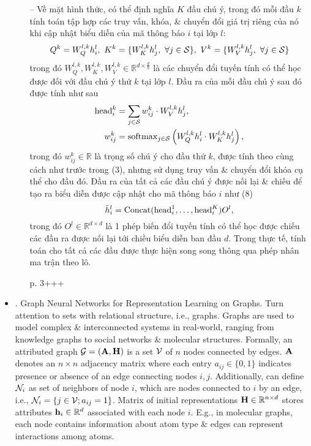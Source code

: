 \documentclass{article}
\begin{document}
\begin{itemize}
\begin{itemize}
        -- Về mặt hình thức, có thể định nghĩa $K$ đầu chú ý, trong đó mỗi đầu $k$ tính toán tập hợp các truy vấn, khóa, \& chuyển đổi giá trị riêng của nó khi cập nhật biểu diễn của mã thông báo $i$ tại lớp $l$:
        \begin{equation*}
            Q^k = W_Q^{l,k}h_i^l,\ K^k = \{W_K^{l,k}h_j^l,\ \forall j\in{\cal S}\},\ V^k = \{W_V^{l,k}h_j^l,\ \forall j\in{\cal S}\}
        \end{equation*}
        trong đó $W_Q^{l,k},W_K^{l,k},W_V^{l,k}\in\mathbb{R}^{d\times\frac{d}{k}}$ là các chuyển đổi tuyến tính có thể học được đối với đầu chú ý thứ $k$ tại lớp $l$. Đầu ra của mỗi đầu chú ý sau đó được tính như sau
        \begin{align*}
            {\rm head}_i^k &= \sum_{j\in{\cal S}} w_{ij}^k\cdot W_V^{l,k}h_j^l,\\
            w_{ij}^k &= {\rm softmax}_{j\in{\cal S}}\left(W_Q^{l,k}h_i^l\cdot W_K^{l,k}h_j^l\right),
        \end{align*}
        trong đó $w_{ij}^k\in\mathbb{R}$ là trọng số chú ý cho đầu thứ $k$, được tính theo cùng cách như trước trong (3), nhưng sử dụng truy vấn \& chuyển đổi khóa cụ thể cho đầu đó. Đầu ra của tất cả các đầu chú ý được nối lại \& chiếu để tạo ra biểu diễn được cập nhật cho mã thông báo $i$ như (8)
        \begin{equation*}
            \tilde{h}_i^l = {\rm Concat}({\rm head}_i^1,\ldots,{\rm head}_i^K)O^l,
        \end{equation*}
        trong đó $O^l\in\mathbb{R}^{d\times d}$ là 1 phép biến đổi tuyến tính có thể học được chiếu các đầu ra được nối lại tới chiều biểu diễn ban đầu $d$. Trong thực tế, tính toán cho tất cả các đầu được thực hiện song song thông qua phép nhân ma trận theo lô.
        
        p. 3+++
    \end{itemize}
    \item {. Graph Neural Networks for Representation Learning on Graphs.} Turn attention to sets with relational structure, i.e., graphs. Graphs are used to model complex \& interconnected systems in real-world, ranging from knowledge graphs to social networks \& molecular structures. Formally, an attributed graph ${\cal G} = ({\bf A},{\bf H})$ is a set ${\cal V}$ of $n$ nodes connected by edges. ${\bf A}$ denotes an $n\times n$ adjacency matrix where each entry $a_{ij}\in\{0,1\}$ indicates presence or absence of an edge connecting nodes $i,j$. Additionally, can define ${\cal N}_i$ as set of neighbors of node $i$, which are nodes connected to $i$ by an edge, i.e., ${\cal N}_i = \{j\in{\cal V};a_{ij} = 1\}$. Matrix of initial representations ${\bf H}\in\mathbb{R}^{n\times d}$ stores attributes ${\bf h}_i\in\mathbb{R}^d$ associated with each node $i$. E.g., in molecular graphs, each node contains information about atom type \& edges can represent interactions among atoms.
    

\end{itemize}
\end{document}
